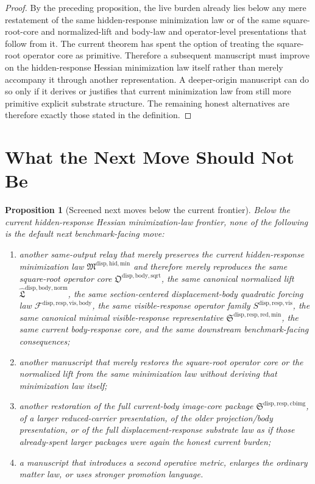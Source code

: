 \documentclass[11pt]{article}
\newcommand{\HiddenMinimizationPackage}{\mathfrak M^{\mathrm{disp,hid,min}}}
\newcommand{\SquareRootOperatorCore}{\mathfrak O^{\mathrm{disp,body,sqrt}}}
\newcommand{\NormalizedLiftPackage}{\widehat{\mathfrak L}^{\mathrm{disp,body,norm}}}
\newcommand{\VisibleBodyForcingLaw}{\mathscr F^{\mathrm{disp,resp,vis,body}}}
\newcommand{\VisibleResponseOperator}{S^{\mathrm{disp,resp,vis}}}
\newcommand{\MinimalReducedStructure}{\mathfrak S^{\mathrm{disp,resp,red,min}}}
\newcommand{\CurrentBodyImageCore}{\mathfrak S^{\mathrm{disp,resp,cbimg}}}
\newtheorem{proposition}{Proposition}
\begin{document}
\begin{proof}
By the preceding proposition, the live burden already lies below any mere restatement of the same hidden-response minimization law or of the same square-root-core and normalized-lift and body-law and operator-level presentations that follow from it. The current theorem has spent the option of treating the square-root operator core as primitive. Therefore a subsequent manuscript must improve on the hidden-response Hessian minimization law itself rather than merely accompany it through another representation. A deeper-origin manuscript can do so only if it derives or justifies that current minimization law from still more primitive explicit substrate structure. The remaining honest alternatives are therefore exactly those stated in the definition.
\end{proof}

\section{What the Next Move Should Not Be}

\begin{proposition}[Screened next moves below the current frontier]
Below the current hidden-response Hessian minimization-law frontier, none of the following is the default next benchmark-facing move:
\begin{enumerate}
    \item another same-output relay that merely preserves the current hidden-response minimization law \(\HiddenMinimizationPackage\) and therefore merely reproduces the same square-root operator core \(\SquareRootOperatorCore\), the same canonical normalized lift \(\NormalizedLiftPackage\), the same section-centered displacement-body quadratic forcing law \(\VisibleBodyForcingLaw\), the same visible-response operator family \(\VisibleResponseOperator\), the same canonical minimal visible-response representative \(\MinimalReducedStructure\), the same current body-response core, and the same downstream benchmark-facing consequences;
    \item another manuscript that merely restores the square-root operator core or the normalized lift from the same minimization law without deriving that minimization law itself;
    \item another restoration of the full current-body image-core package \(\CurrentBodyImageCore\), of a larger reduced-carrier presentation, of the older projection/body presentation, or of the full displacement-response substrate law as if those already-spent larger packages were again the honest current burden;
    \item a manuscript that introduces a second operative metric, enlarges the ordinary matter law, or uses stronger promotion language.
\end{enumerate}
\end{proposition}
\end{document}
